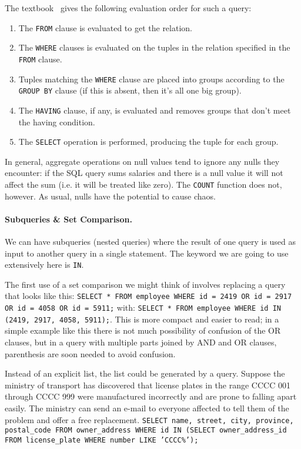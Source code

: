 The textbook~\cite{dsc} gives the following evaluation order for such a query:

\begin{enumerate}
	\item The \texttt{FROM} clause is evaluated to get the relation.
	\item The \texttt{WHERE} clauses is evaluated on the tuples in the relation specified in the \texttt{FROM} clause.
	\item Tuples matching the \texttt{WHERE} clause are placed into groups according to the \texttt{GROUP BY} clause (if this is absent, then it's all one big group).
	\item The \texttt{HAVING} clause, if any, is evaluated and removes groups that don't meet the having condition.
	\item The \texttt{SELECT} operation is performed, producing the tuple for each group.
\end{enumerate}

In general, aggregate operations on null values tend to ignore any nulls they encounter: if the SQL query sums salaries and there is a null value it will not affect the sum (i.e. it will be treated like zero). The \texttt{COUNT} function does not, however. As usual, nulls have the potential to cause chaos.
	
\paragraph{Subqueries \& Set Comparison.}
We can have subqueries (nested queries) where the result of one query is used as input to another query in a single statement. The keyword we are going to use extensively here is \texttt{IN}.  

The first use of a set comparison we might think of involves replacing a query that looks like this: \texttt{SELECT * FROM employee WHERE id = 2419 OR id = 2917 OR id = 4058 OR id = 5911;} with: \texttt{SELECT * FROM employee WHERE id IN (2419, 2917, 4058, 5911);}. This is more compact and easier to read; in a simple example like this there is not much possibility of confusion of the OR clauses, but in a query with multiple parts joined by AND and OR clauses, parenthesis are soon needed to avoid confusion. 

Instead of an explicit list, the list could be generated by a query. Suppose the ministry of transport has discovered that license plates in the range CCCC 001 through CCCC 999 were manufactured incorrectly and are prone to falling apart easily. The ministry can send an e-mail to everyone affected to tell them of the problem and offer a free replacement. \texttt{SELECT name, street, city, province, postal\_code FROM owner\_address WHERE id IN (SELECT owner\_address\_id FROM license\_plate WHERE number LIKE 'CCCC\%');}



